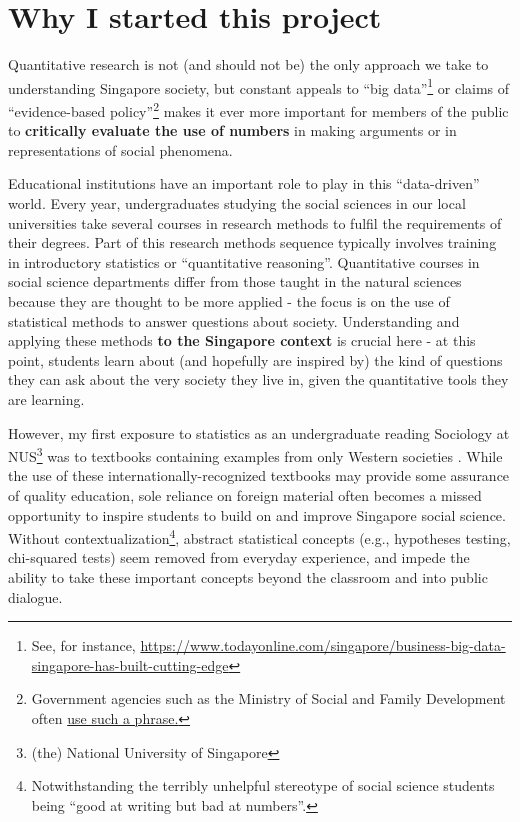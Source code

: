 \documentclass[
  openany]{book}
\begin{document}
\hypertarget{why-i-started-this-project}{%
\section*{Why I started this project}\label{why-i-started-this-project}}

Quantitative research is not (and should not be) the only approach we take to understanding Singapore society, but constant appeals to ``big data''\footnote{See, for instance, \url{https://www.todayonline.com/singapore/business-big-data-singapore-has-built-cutting-edge}} or claims of ``evidence-based policy''\footnote{Government agencies such as the Ministry of Social and Family Development often \href{https://www.msf.gov.sg/about-MSF/our-people/Divisions-at-MSF/Family-Development-and-Support/Pages/default.aspx}{use such a phrase.}} makes it ever more important for members of the public to \textbf{critically evaluate the use of numbers} in making arguments or in representations of social phenomena.

Educational institutions have an important role to play in this ``data-driven'' world. Every year, undergraduates studying the social sciences in our local universities take several courses in research methods to fulfil the requirements of their degrees. Part of this research methods sequence typically involves training in introductory statistics or ``quantitative reasoning''. Quantitative courses in social science departments differ from those taught in the natural sciences because they are thought to be more applied - the focus is on the use of statistical methods to answer questions about society. Understanding and applying these methods \textbf{to the Singapore context} is crucial here - at this point, students learn about (and hopefully are inspired by) the kind of questions they can ask about the very society they live in, given the quantitative tools they are learning.

However, my first exposure to statistics as an undergraduate reading Sociology at NUS\footnote{(the) National University of Singapore} was to textbooks containing examples from only Western societies \citep[e.g.,][]{agresti_statistical_2009, treiman_quantitative_2009}. While the use of these internationally-recognized textbooks may provide some assurance of quality education, sole reliance on foreign material often becomes a missed opportunity to inspire students to build on and improve Singapore social science. Without contextualization\footnote{Notwithstanding the terribly unhelpful stereotype of social science students being ``good at writing but bad at numbers''.}, abstract statistical concepts (e.g., hypotheses testing, chi-squared tests) seem removed from everyday experience, and impede the ability to take these important concepts beyond the classroom and into public dialogue.
\end{document}

